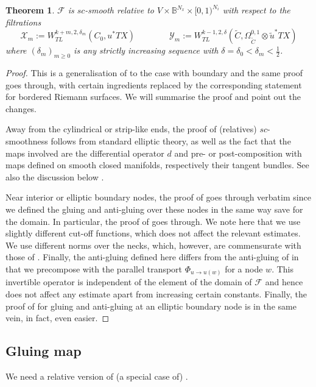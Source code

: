 \documentclass[11pt,psamsfonts, oneside, reqno]{amsart}
\newcommand{\bB}{\mathbb{B}}
\newcommand{\cF}{\mathcal{F}}
\newcommand{\cX}{\mathcal{X}}
\newcommand{\cY}{\mathcal{Y}}
\newcommand{\wt}{\widetilde}
\newtheorem{theorem}{Theorem}[section]
\theoremstyle{definition}
\theoremstyle{remark}
\numberwithin{equation}{section}
\begin{document}
\begin{theorem}\label{prop:cr-sc-smooth} $\cF$ is 
	$sc$-smooth relative to $V\times \bB^{N_x}\times[0,1)^{N_i}$ with respect to the filtrations 
	$$\cX_m := W^{k+m,2,\delta_m}_{TL}(C_0,u^*TX) \qquad \qquad \cY_m := W^{k-1,2,\delta}_{TL}(\wt C,\Omega^{0,1}_{\wt C}\otimes \wt{u}^*TX)$$\noindent
	where $(\delta_m)_{m\geq 0}$ is any strictly increasing sequence with $\delta = \delta_0 < \delta_m  < \frac12$.
\end{theorem}

\begin{proof} This is a generalisation of \cite[Proposition~4.21]{HWZ17} to the case with boundary and the same proof goes through, with certain ingredients replaced by the corresponding statement for bordered Riemann surfaces. We will summarise the proof and point out the changes.\par
	Away from the cylindrical or strip-like ends, the proof of (relatives) $sc$-smoothness follows from standard elliptic theory, as well as the fact that the maps involved are the differential operator $d$ and pre- or post-composition with maps defined on smooth closed manifolds, respectively their tangent bundles. See also the discussion below \cite[Equation~(4.16)]{HWZ17}.\par 
	Near interior or elliptic boundary nodes, the proof of \cite[Proposition~4.21]{HWZ17} goes through verbatim since we defined the gluing and anti-gluing over these nodes in the same way save for the domain. In particular, the proof of \cite[Proposition~4.11]{HWZ17} goes through. We note here that we use slightly different cut-off functions, which does not affect the relevant estimates. We use different norms over the necks, which, however, are commensurate with those of \cite{HWZ17}. Finally, the anti-gluing defined here differs from the anti-gluing of \cite{HWZ17} in that we precompose with the parallel transport $\Phi_{u \to u(w)}$ for a node $w$. This invertible operator is independent of the element of the domain of $\cF$ and hence does not affect any estimate apart from increasing certain constants. Finally, the proof of \cite[Proposition~4.11]{HWZ17} for gluing and anti-gluing at an elliptic boundary node is in the same vein, in fact, even easier.
\end{proof}	  


\subsection{Gluing map}\label{subsec:gluing-map} 
We need a relative version of (a special case of) \cite[Theorem~4.6]{HWZ09}.
\end{document}
